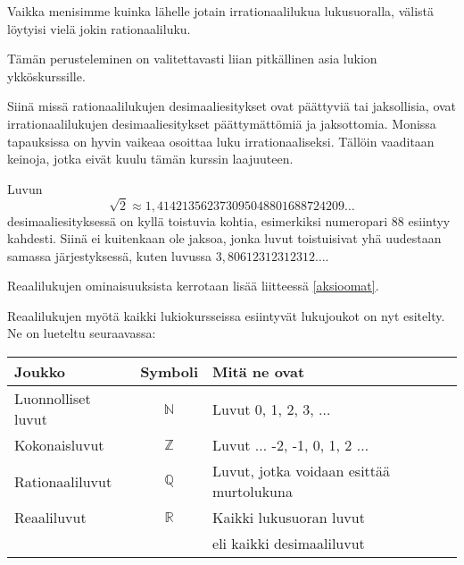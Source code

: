 Vaikka menisimme kuinka lähelle jotain irrationaalilukua lukusuoralla, välistä löytyisi vielä jokin rationaaliluku.



Tämän perusteleminen on valitettavasti liian pitkällinen asia lukion ykköskurssille.

Siinä missä rationaalilukujen desimaaliesitykset ovat päättyviä tai jaksollisia, ovat irrationaalilukujen desimaaliesitykset päättymättömiä ja
jaksottomia. Monissa tapauksissa on hyvin vaikeaa osoittaa luku irrationaaliseksi. Tällöin vaaditaan keinoja, jotka eivät kuulu tämän kurssin laajuuteen.

Luvun
\[\sqrt{2} \approx 1,414213562373095048801688724209\ldots\]
desimaaliesityksessä on kyllä toistuvia kohtia, esimerkiksi numeropari $88$ esiintyy kahdesti. Siinä ei kuitenkaan ole jaksoa, jonka luvut toistuisivat yhä uudestaan
samassa järjestyksessä, kuten luvussa $3,80612312312312\ldots$.

Reaalilukujen ominaisuuksista kerrotaan lisää liitteessä \ref{aksioomat}.


Reaalilukujen myötä kaikki lukiokursseissa esiintyvät lukujoukot on nyt esitelty. Ne on lueteltu seuraavassa:
\begin{center}\begin{tabular}{l|c|l}
Joukko & Symboli & Mitä ne ovat\\
\hline
Luonnolliset luvut & $\mathbb{N}$ &
Luvut 0, 1, 2, 3, $\ldots$ \\
Kokonaisluvut & $\mathbb{Z}$ & Luvut $\ldots$ -2, -1, 0, 1, 2 $\ldots$ \\
Rationaaliluvut & $\mathbb{Q}$ & Luvut, jotka voidaan esittää
murtolukuna \\
Reaaliluvut & $\mathbb{R}$ & Kaikki lukusuoran luvut \\
& & eli kaikki desimaaliluvut
\end{tabular} \end{center} 

